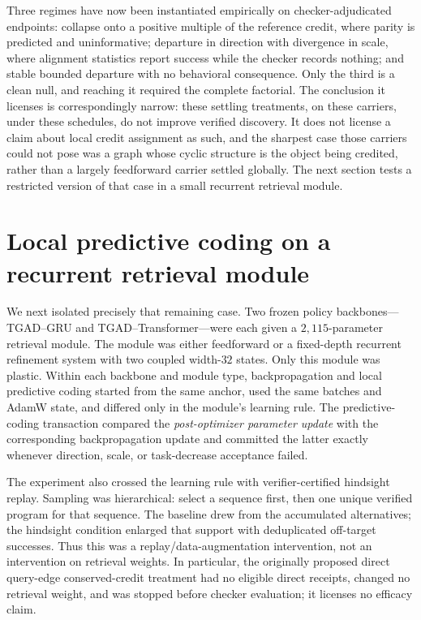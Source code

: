 \documentclass[11pt]{article}
\begin{document}
Three regimes have now been instantiated empirically on checker-adjudicated endpoints:
collapse onto a positive multiple of the reference credit, where parity is predicted and
uninformative; departure in direction with divergence in scale, where alignment statistics
report success while the checker records nothing; and stable bounded departure with no
behavioral consequence. Only the third is a clean null, and reaching it required the
complete factorial. The conclusion it licenses is correspondingly narrow: these settling
treatments, on these carriers, under these schedules, do not improve verified discovery.
It does not license a claim about local credit assignment as such, and the sharpest
case those carriers could not pose was a graph whose cyclic structure is the object being
credited, rather than a largely feedforward carrier settled globally.  The next section
tests a restricted version of that case in a small recurrent retrieval module.

\section{Local predictive coding on a recurrent retrieval module}
\label{sec:action-memory-pc}

We next isolated precisely that remaining case.  Two frozen policy backbones---TGAD--GRU
and TGAD--Transformer---were each given a $2{,}115$-parameter retrieval module.  The
module was either feedforward or a fixed-depth recurrent refinement system with two
coupled width-$32$ states.  Only this module was plastic.  Within each backbone and
module type, backpropagation and local predictive coding started from the same anchor,
used the same batches and AdamW state, and differed only in the module's learning rule.
The predictive-coding transaction compared the \emph{post-optimizer parameter update}
with the corresponding backpropagation update and committed the latter exactly whenever
direction, scale, or task-decrease acceptance failed.

The experiment also crossed the learning rule with verifier-certified hindsight replay.
Sampling was hierarchical: select a sequence first, then one unique verified program for
that sequence.  The baseline drew from the accumulated alternatives; the hindsight
condition enlarged that support with deduplicated off-target successes.  Thus this was a
replay/data-augmentation intervention, not an intervention on retrieval weights.  In
particular, the originally proposed direct query-edge conserved-credit treatment had no
eligible direct receipts, changed no retrieval weight, and was stopped before checker
evaluation; it licenses no efficacy claim.
\end{document}
